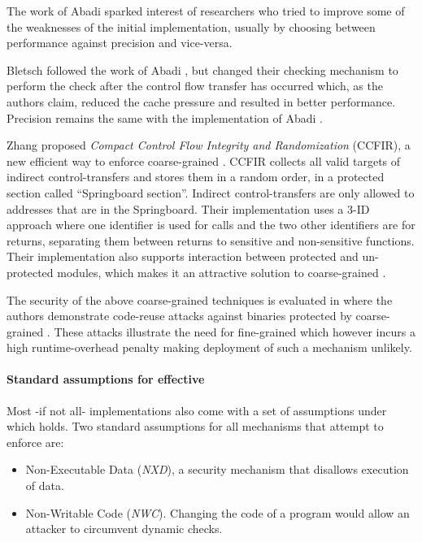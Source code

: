 The work of Abadi \ETAL sparked interest of researchers who tried to improve
some of the weaknesses of the initial implementation, usually by choosing
between performance against precision and vice-versa.

Bletsch \ETAL \cite{Bletsch:2011:MCA:2076732.2076783} followed the work
of Abadi \ETAL, but changed their checking mechanism to perform the check
after the control flow transfer has occurred which, as the authors claim,
reduced the cache pressure and resulted in better performance. Precision remains
the same with the implementation of Abadi \ETAL.

Zhang \ETAL \cite{Zhang2013} proposed \emph{Compact Control Flow Integrity
and Randomization} (CCFIR), a new efficient way to enforce coarse-grained \CFI.
CCFIR collects all valid targets of indirect control-transfers and stores them
in a random order, in a protected section called ``Springboard section''.
Indirect control-transfers are only allowed to addresses that are in the
Springboard. Their implementation uses a 3-ID approach where one identifier is
used for calls and the two other identifiers are for returns, separating them
between returns to sensitive and non-sensitive functions. Their implementation
also supports interaction between protected and un-protected modules, which
makes it an attractive solution to coarse-grained \CFI.

The security of the above coarse-grained techniques is evaluated in
\cite{outofcontrol_ieeesp2014} where the authors demonstrate
code-reuse attacks against binaries protected by coarse-grained
\CFI. These attacks illustrate the need for fine-grained \CFI which
however incurs a high runtime-overhead penalty making deployment of
such a mechanism unlikely.


\paragraph{Standard assumptions for effective \CFI}\label{sec:cfi_assumptions}

Most -if not all- \CFI implementations also come with a set of assumptions under
which \CFI holds. Two standard assumptions for all mechanisms that attempt to
enforce \CFI are:
\begin{itemize}
\item Non-Executable Data (\emph{NXD}), a security
mechanism that disallows execution of data.
\item Non-Writable Code (\emph{NWC}). Changing the code of a
program would allow an attacker to circumvent dynamic checks.
\end{itemize}

